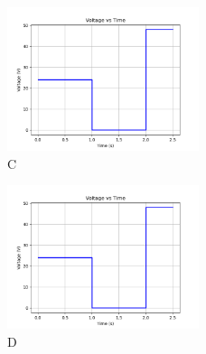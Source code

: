 \documentclass{article}
\begin{document}
\begin{enumerate}
    \begin{figure}[h!]
    \centering
      \hspace{-1cm}
      \includegraphics[width=0.5\textwidth]{Figure_8.png}
      \caption{C}
      \label{fig:your_label}
    \end{figure}

    \begin{figure}[h!]
    \centering
      \hspace{-1cm}
      \includegraphics[width=0.5\textwidth]{Figure_5.png}
      \caption{D}
      \label{fig:your_label}
    \end{figure}

    
    


   
   
\end{enumerate}
\end{document}
